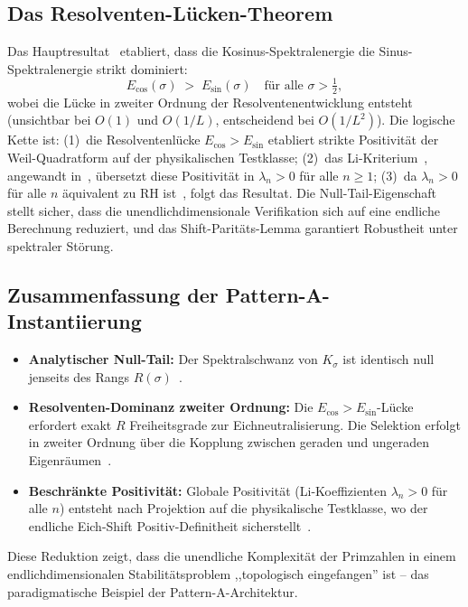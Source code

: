 \documentclass[12pt,a4paper]{article}
\theoremstyle{definition}
\theoremstyle{remark}
\begin{document}
\subsection{Das Resolventen-Lücken-Theorem}

Das Hauptresultat~\cite{Geiger2026b,Geiger2026c} etabliert, dass die Kosinus-Spektralenergie die Sinus-Spektralenergie strikt dominiert:
\[
E_{\cos}(\sigma) \;>\; E_{\sin}(\sigma) \quad \text{für alle } \sigma > \tfrac{1}{2},
\]
wobei die Lücke in zweiter Ordnung der Resolventenentwicklung entsteht (unsichtbar bei $O(1)$ und $O(1/L)$, entscheidend bei $O(1/L^2)$). Die logische Kette ist: (1)~die Resolventenlücke $E_{\cos} > E_{\sin}$ etabliert strikte Positivität der Weil-Quadratform auf der physikalischen Testklasse; (2)~das Li-Kriterium~\cite{Li1997}, angewandt in~\cite{Geiger2026c}, übersetzt diese Positivität in $\lambda_n > 0$ für alle $n \ge 1$; (3)~da $\lambda_n > 0$ für alle $n$ äquivalent zu RH ist~\cite{Li1997}, folgt das Resultat. Die Null-Tail-Eigenschaft stellt sicher, dass die unendlichdimensionale Verifikation sich auf eine endliche Berechnung reduziert, und das Shift-Paritäts-Lemma garantiert Robustheit unter spektraler Störung.

\subsection{Zusammenfassung der Pattern-A-Instantiierung}

\begin{itemize}
    \item \textbf{Analytischer Null-Tail:} Der Spektralschwanz von $K_\sigma$ ist identisch null jenseits des Rangs $R(\sigma)$~\cite{Geiger2026a}.
    \item \textbf{Resolventen-Dominanz zweiter Ordnung:} Die $E_{\cos} > E_{\sin}$-Lücke erfordert exakt $R$ Freiheitsgrade zur Eichneutralisierung. Die Selektion erfolgt in zweiter Ordnung über die Kopplung zwischen geraden und ungeraden Eigenräumen~\cite{Geiger2026b}.
    \item \textbf{Beschränkte Positivität:} Globale Positivität (Li-Koeffizienten $\lambda_n > 0$ für alle $n$) entsteht nach Projektion auf die physikalische Testklasse, wo der endliche Eich-Shift Positiv-Definitheit sicherstellt~\cite{Geiger2026c}.
\end{itemize}
Diese Reduktion zeigt, dass die unendliche Komplexität der Primzahlen in einem endlichdimensionalen Stabilitätsproblem ,,topologisch eingefangen'' ist -- das paradigmatische Beispiel der Pattern-A-Architektur.
\end{document}

